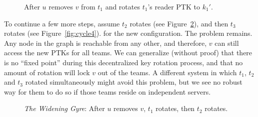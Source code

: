 \begin{figure}[ht]
    \centering
    \caption{After $u$ removes $v$ from $t_1$ and rotates $t_1$'s reader PTK to $k_1'$.}
    \label{fig:cycle2}
\end{figure}

To continue a few more steps, assume $t_2$ rotates (see Figure~\ref{fig:cycle3}), 
and then $t_3$ rotates (see Figure~\ref{fig:cycle4}).
for the new configuration. The problem remains. Any node in the graph is reachable from any other,
and therefore, $v$ can still access the new PTKs for all teams. We can generalize (without proof)
that there is no ``fixed point'' during this decentralized key rotation process, and that no amount
of rotation will lock $v$ out of the teams. A different system in which $t_1$, $t_2$ and $t_3$
rotated simultaneously might avoid this problem, but we see no robust way for them to do so 
if those teams reside on independent servers.

\begin{figure}[ht]
    \centering
    \caption{\textit{The Widening Gyre}: After $u$ removes $v$, $t_1$ rotates, then $t_2$ rotates.}
    \label{fig:cycle3}
\end{figure}

